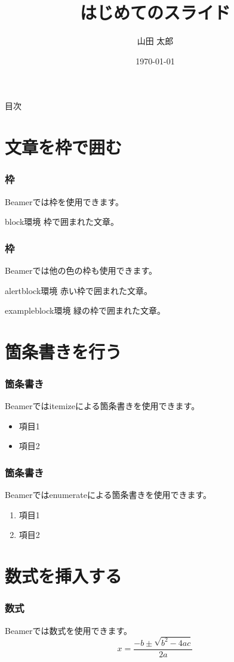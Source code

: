\documentclass{beamer}
\title{はじめてのスライド}
\author{山田 太郎}
\institute{羅手府大学}
\date{\today}
\begin{document}
\maketitle

\begin{frame}{目次}
\tableofcontents
\end{frame}

\section{文章を枠で囲む}
\begin{frame}
  \frametitle{枠}
  Beamerでは枠を使用できます。
  \begin{block}{block環境}
    枠で囲まれた文章。
  \end{block}
\end{frame}

\begin{frame}
  \frametitle{枠}
  Beamerでは他の色の枠も使用できます。
  \begin{alertblock}{alertblock環境}
    赤い枠で囲まれた文章。
  \end{alertblock}
  \begin{exampleblock}{exampleblock環境}
    緑の枠で囲まれた文章。
  \end{exampleblock}
\end{frame}

\section{箇条書きを行う}
\begin{frame}
  \frametitle{箇条書き}
  Beamerではitemizeによる箇条書きを使用できます。
  \begin{itemize}
    \item
    項目1
    \item
    項目2
  \end{itemize}
\end{frame}

\begin{frame}
  \frametitle{箇条書き}
  Beamerではenumerateによる箇条書きを使用できます。
  \begin{enumerate}
    \item
    項目1
    \item
    項目2
  \end{enumerate}
\end{frame}

\section{数式を挿入する}
\begin{frame}
\frametitle{数式}
Beamerでは数式を使用できます。
\[ x = \frac{-b \pm \sqrt{b^2 - 4ac}}{2a} \]
\end{frame}
\end{document}
